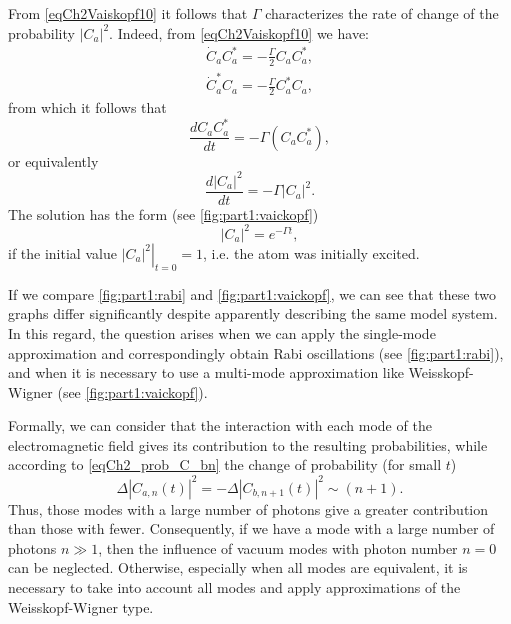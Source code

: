 From \eqref{eqCh2Vaiskopf10} it follows that $\Gamma$ characterizes
the rate of change of the probability $\left|C_{a}\right|^2$. Indeed,
from \eqref{eqCh2Vaiskopf10} we have:
\begin{eqnarray}
\dot{C}_{a}C_{a}^{*} = - \frac{\Gamma}{2}C_{a}C_{a}^{*},
\nonumber \\
\dot{C}_{a}^{*}C_{a} = - \frac{\Gamma}{2}C_{a}^{*}C_{a},
\nonumber
\end{eqnarray}
from which it follows that
\begin{equation}
\frac{d C_{a}C_{a}^{*}}{dt} = -\Gamma \left(C_{a}C_{a}^{*}\right),
\nonumber
\end{equation}
or equivalently
\begin{equation}
\frac{d \left|C_{a}\right|^2}{dt} = -\Gamma \left|C_{a}\right|^2.
\nonumber
\end{equation}
The solution has the form (see \autoref{fig:part1:vaickopf})
\[
\left|C_{a}\right|^2 = e^{- \Gamma t},
\]
if the initial value $\left.\left|C_{a}\right|^2\right|_{t = 0} =
1$, i.e. the atom was initially excited.

 

\begin{remark}
If we compare \autoref{fig:part1:rabi} and
\autoref{fig:part1:vaickopf}, we can see that these two graphs
differ significantly despite apparently describing the same model system.
In this regard, the question arises when we can
apply the single-mode approximation and correspondingly obtain
Rabi oscillations (see \autoref{fig:part1:rabi}), and when it is necessary
to use a multi-mode approximation like
Weisskopf-Wigner (see \autoref{fig:part1:vaickopf}).

Formally, we can consider that the interaction with each mode
of the electromagnetic field gives its contribution to the resulting probabilities,
while according to \eqref{eqCh2_prob_C_bn} the change
of probability (for small $t$)
\[
\Delta \left|C_{a, n}\left(t\right)\right|^2 = -\Delta \left|C_{b, n +
  1}\left(t\right)\right|^2 \sim \left(n + 1\right).
\]
Thus, those modes with a large number of photons give a greater contribution than
those with fewer. Consequently, if we have a mode with
a large number of photons $n \gg 1$, then the influence of vacuum modes with photon number $n = 0$ can be neglected. Otherwise,
especially when all modes are equivalent, it is necessary to take into account all modes and
apply approximations of the Weisskopf-Wigner type.
\end{remark}